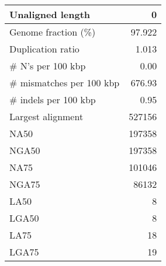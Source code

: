 \documentclass[12pt,a4paper]{article}
\begin{document}
\begin{table}[ht]
\begin{center}
\begin{tabular}{|l*{1}{|r}|}
Unaligned length & 0 \\ \hline
Genome fraction (\%) & 97.922 \\ \hline
Duplication ratio & 1.013 \\ \hline
\# N's per 100 kbp & 0.00 \\ \hline
\# mismatches per 100 kbp & 676.93 \\ \hline
\# indels per 100 kbp & 0.95 \\ \hline
Largest alignment & 527156 \\ \hline
NA50 & 197358 \\ \hline
NGA50 & 197358 \\ \hline
NA75 & 101046 \\ \hline
NGA75 & 86132 \\ \hline
LA50 & 8 \\ \hline
LGA50 & 8 \\ \hline
LA75 & 18 \\ \hline
LGA75 & 19 \\ \hline
\end{tabular}
\end{center}
\end{table}
\end{document}
